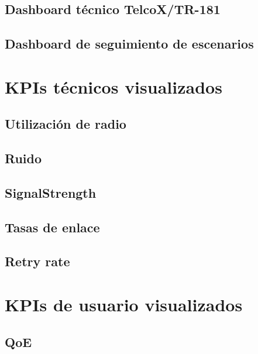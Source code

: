 \subsection{Dashboard técnico TelcoX/TR-181}
\label{subsec:dashboard-tecnico-telcox-tr181}

\subsection{Dashboard de seguimiento de escenarios}
\label{subsec:dashboard-seguimiento-escenarios}


\section{KPIs técnicos visualizados}
\label{sec:kpis-tecnicos-visualizados}

\subsection{Utilización de radio}
\label{subsec:utilizacion-radio-visualizada}

\subsection{Ruido}
\label{subsec:ruido-visualizado}

\subsection{SignalStrength}
\label{subsec:signalstrength-visualizado}

\subsection{Tasas de enlace}
\label{subsec:tasas-enlace-visualizadas}

\subsection{Retry rate}
\label{subsec:retry-rate-visualizado}


\section{KPIs de usuario visualizados}
\label{sec:kpis-usuario-visualizados}

\subsection{QoE}
\label{subsec:qoe-visualizado}

